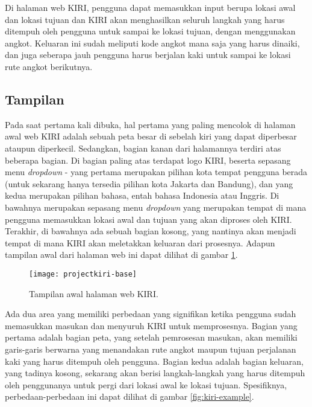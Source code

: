 Di halaman web KIRI, pengguna dapat memasukkan input berupa lokasi awal dan lokasi tujuan dan KIRI akan menghasilkan seluruh langkah yang harus ditempuh oleh pengguna untuk sampai ke lokasi tujuan, dengan menggunakan angkot. Keluaran ini sudah meliputi kode angkot mana saja yang harus dinaiki, dan juga seberapa jauh pengguna harus berjalan kaki untuk sampai ke lokasi rute angkot berikutnya.

\subsection{Tampilan}
\label{sec:kiri-appearance}

Pada saat pertama kali dibuka, hal pertama yang paling mencolok di halaman awal web KIRI adalah sebuah peta besar di sebelah kiri yang dapat diperbesar ataupun diperkecil. Sedangkan, bagian kanan dari halamannya terdiri atas beberapa bagian. Di bagian paling atas terdapat logo KIRI, beserta sepasang menu \textit{dropdown} - yang pertama merupakan pilihan kota tempat pengguna berada (untuk sekarang hanya tersedia pilihan kota Jakarta dan Bandung), dan yang kedua merupakan pilihan bahasa, entah bahasa Indonesia atau Inggris. Di bawahnya merupakan sepasang menu \textit{dropdown} yang merupakan tempat di mana pengguna memasukkan lokasi awal dan tujuan yang akan diproses oleh KIRI. Terakhir, di bawahnya ada sebuah bagian kosong, yang nantinya akan menjadi tempat di mana KIRI akan meletakkan keluaran dari prosesnya. Adapun tampilan awal dari halaman web ini dapat dilihat di gambar \ref{fig:kiri-base}.

\begin{figure}[ht]
    \centering
    \texttt{[image: projectkiri-base]}
    \caption[Tampilan awal halaman web KIRI]{Tampilan awal halaman web KIRI.}
    \label{fig:kiri-base}
\end{figure}

Ada dua area yang memiliki perbedaan yang signifikan ketika pengguna sudah memasukkan masukan dan menyuruh KIRI untuk memprosesnya. Bagian yang pertama adalah bagian peta, yang setelah pemrosesan masukan, akan memiliki garis-garis berwarna yang menandakan rute angkot maupun tujuan perjalanan kaki yang harus ditempuh oleh pengguna. Bagian kedua adalah bagian keluaran, yang tadinya kosong, sekarang akan berisi langkah-langkah yang harus ditempuh oleh penggunanya untuk pergi dari lokasi awal ke lokasi tujuan. Spesifiknya, perbedaan-perbedaan ini dapat dilihat di gambar \ref{fig:kiri-example}.

